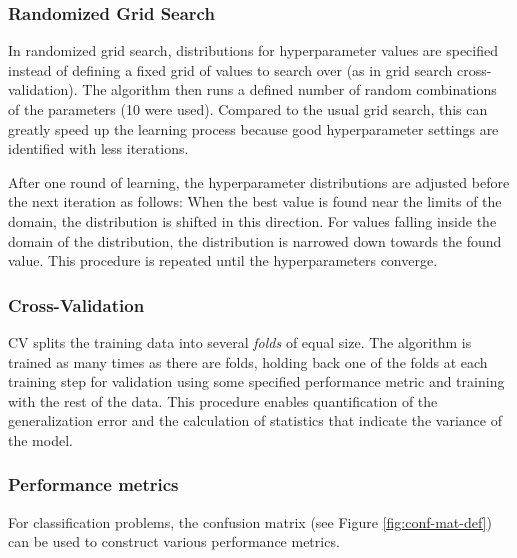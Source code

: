 \documentclass[
  11pt,
  a4paper,
  DIV=12,captions=tableheading,oneside,titlepage=firstiscover,abstracton]{scrreprt}
\begin{document}
\hypertarget{randomized-grid-search}{%
\subsubsection{Randomized Grid Search}\label{randomized-grid-search}}

In randomized grid search, distributions for hyperparameter values are specified instead of defining a fixed grid of values to search over (as in grid search cross-validation). The algorithm then runs a defined number of random combinations of the parameters (10 were used). Compared to the usual grid search, this can greatly speed up the learning process because good hyperparameter settings are identified with less iterations.

After one round of learning, the hyperparameter distributions are adjusted before the next iteration as follows: When the best value is found near the limits of the domain, the distribution is shifted in this direction. For values falling inside the domain of the distribution, the distribution is narrowed down towards the found value. This procedure is repeated until the hyperparameters converge.

\hypertarget{cross-validation}{%
\subsubsection{Cross-Validation}\label{cross-validation}}

CV splits the training data into several \emph{folds} of equal size. The algorithm is trained as many times as there are folds, holding back one of the folds at each training step for validation using some specified performance metric and training with the rest of the data. This procedure enables quantification of the generalization error and the calculation of statistics that indicate the variance of the model.

\hypertarget{performance-metrics}{%
\subsubsection{Performance metrics}\label{performance-metrics}}

For classification problems, the confusion matrix (see Figure \ref{fig:conf-mat-def}) can be used to construct various performance metrics.
\end{document}
